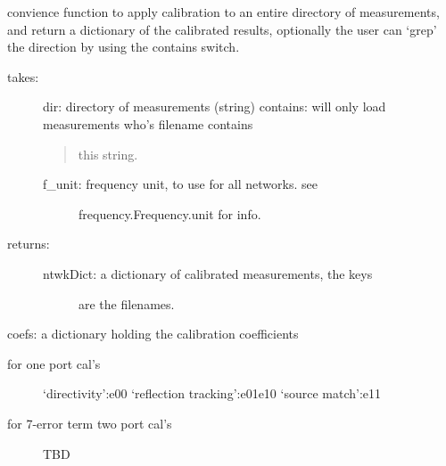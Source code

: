 \documentclass[letterpaper,10pt,english]{sphinxmanual}
\begin{document}
\begin{fulllineitems}
\begin{fulllineitems}
\label{api/mwavepy.calibration:mwavepy.calibration.calibration.Calibration.apply_cal_to_all_in_dir}
convience function to apply calibration to an entire directory
of measurements, and return a dictionary of the calibrated
results, optionally the user can `grep' the direction
by using the contains switch.
\begin{description}
\item[{takes:}] \leavevmode
dir: directory of measurements (string)
contains: will only load measurements who's filename contains
\begin{quote}

this string.
\end{quote}
\begin{description}
\item[{f\_unit: frequency unit, to use for all networks. see}] \leavevmode
frequency.Frequency.unit for info.

\end{description}

\item[{returns:}] \leavevmode\begin{description}
\item[{ntwkDict: a dictionary of calibrated measurements, the keys}] \leavevmode
are the filenames.

\end{description}

\end{description}

\end{fulllineitems}


\begin{fulllineitems}
\label{api/mwavepy.calibration:mwavepy.calibration.calibration.Calibration.coefs}
coefs: a dictionary holding the calibration coefficients
\begin{description}
\item[{for one port cal's}] \leavevmode
`directivity':e00
`reflection tracking':e01e10
`source match':e11

\item[{for 7-error term two port cal's}] \leavevmode
TBD

\end{description}


\end{fulllineitems}
\end{fulllineitems}
\end{document}
